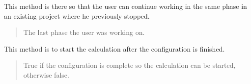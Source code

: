 \documentclass[letterpaper,10pt,english]{sphinxmanual}
\begin{document}
\begin{fulllineitems}
\begin{fulllineitems}
\end{fulllineitems}


\begin{fulllineitems}
\label{\detokenize{apidoc/src.osm_configurator.model.project:src.osm_configurator.model.project.active_project.ActiveProject.get_last_step}}
\pysigstartsignatures
{}
\pysigstopsignatures
\sphinxAtStartPar
This method is there so that the user can continue working in the same phase in an existing project
where he previously stopped.
\begin{quote}\begin{description}
\sphinxAtStartPar
The last phase the user was working on.

\sphinxAtStartPar
{\hyperref[\detokenize{apidoc/src.osm_configurator.model.project:src.osm_configurator.model.project.config_phase_enum.ConfigPhase}]{}}

\end{description}\end{quote}

\end{fulllineitems}


\begin{fulllineitems}
\label{\detokenize{apidoc/src.osm_configurator.model.project:src.osm_configurator.model.project.active_project.ActiveProject.start_calculation}}
\pysigstartsignatures
{}
\pysigstopsignatures
\sphinxAtStartPar
This method is to start the calculation after the configuration is finished.
\begin{quote}\begin{description}
\sphinxAtStartPar
True if the configuration is complete so the calculation can be started, otherwise false.

\sphinxAtStartPar
{\hyperref[\detokenize{apidoc/src.osm_configurator.model.project.calculation:src.osm_configurator.model.project.calculation.calculation_state_enum.CalculationState}]{}}


\end{description}
\end{quote}
\end{fulllineitems}
\end{fulllineitems}
\end{document}

